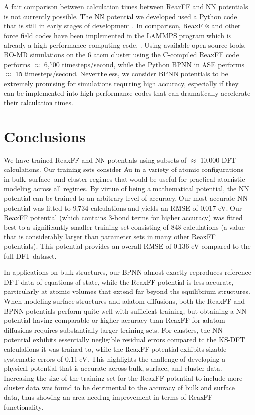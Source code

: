 \documentclass[12pt]{cmuthesis}
\begin{document}
A fair comparison between calculation times between ReaxFF and NN potentials is not currently possible. The NN potential we developed used a Python code that is still in early stages of development \cite{khorshidi-2016-amp}. In comparison, ReaxFFs and other force field codes have been implemented in the LAMMPS program which is already a high performance computing code. \cite{plimpton-1995-fast-paral}. Using available open source tools, BO-MD simulations on the 6 atom cluster using the C-compiled ReaxFF code performs \(\approx\) 6,700 timesteps/second, while the Python BPNN in ASE performs \(\approx\) 15 timesteps/second. Nevertheless, we consider BPNN potentials to be extremely promising for simulations requiring high accuracy, especially if they can be implemented into high performance codes that can dramatically accelerate their calculation times.

\section{Conclusions}
\label{sec:org0c2433b}
We have trained ReaxFF and NN potentials using subsets of \(\approx\) 10,000 DFT calculations. Our training sets consider Au in a variety of atomic configurations in bulk, surface, and cluster regimes that would be useful for practical atomistic modeling across all regimes. By virtue of being a mathematical potential, the NN potential can be trained to an arbitrary level of accuracy. Our most accurate NN potential was fitted to 9,734 calculations and yields an RMSE of 0.017 eV. Our ReaxFF potential (which contains 3-bond terms for higher accuracy) was fitted best to a significantly smaller training set consisting of 848 calculations (a value that is considerably larger than parameter sets in many other ReaxFF potentials). This potential provides an overall RMSE of 0.136 eV compared to the full DFT dataset.

In applications on bulk structures, our BPNN almost exactly reproduces reference DFT data of equations of state, while the ReaxFF potential is less accurate, particularly at atomic volumes that extend far beyond the equilibrium structures. When modeling surface structures and adatom diffusions, both the ReaxFF and BPNN potentials perform quite well with sufficient training, but obtaining a NN potential having comparable or higher accuracy than ReaxFF for adatom diffusions requires substantially larger training sets. For clusters, the NN potential exhibits essentially negligible residual errors compared to the KS-DFT calculations it was trained to, while the ReaxFF potential exhibits sizable systematic errors of 0.11 eV. This highlights the challenge of developing a physical potential that is accurate across bulk, surface, and cluster data. Increasing the size of the training set for the ReaxFF potential to include more cluster data was found to be detrimental to the accuracy of bulk and surface data, thus showing an area needing improvement in terms of ReaxFF functionality.
\end{document}
